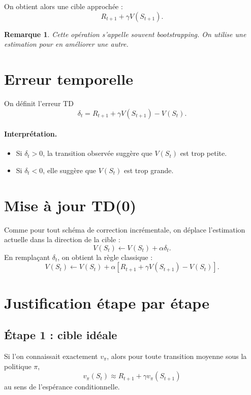 \documentclass[11pt,a4paper]{article}
\newtheorem*{remarque}{Remarque}
\begin{document}
On obtient alors une cible approchée :
\[
R_{t+1}+\gamma V(S_{t+1}).
\]

\begin{remarque}
Cette opération s'appelle souvent \emph{bootstrapping}. On utilise une estimation pour en améliorer une autre.
\end{remarque}

\section{Erreur temporelle}

On définit l'erreur TD
\[
\delta_t = R_{t+1}+\gamma V(S_{t+1})-V(S_t).
\]

\paragraph{Interprétation.}
\begin{itemize}[leftmargin=1.6em]
    \item Si $\delta_t>0$, la transition observée suggère que $V(S_t)$ est trop petite.
    \item Si $\delta_t<0$, elle suggère que $V(S_t)$ est trop grande.
\end{itemize}

\section{Mise à jour TD(0)}

Comme pour tout schéma de correction incrémentale, on déplace l'estimation actuelle dans la direction de la cible :
\[
V(S_t)\leftarrow V(S_t)+\alpha\delta_t.
\]
En remplaçant $\delta_t$, on obtient la règle classique :
\[
V(S_t)\leftarrow V(S_t)+\alpha\left[R_{t+1}+\gamma V(S_{t+1})-V(S_t)\right].
\]

\section{Justification étape par étape}

\subsection{Étape 1 : cible idéale}

Si l'on connaissait exactement $v_{\pi}$, alors pour toute transition moyenne sous la politique $\pi$,
\[
v_{\pi}(S_t)\approx R_{t+1}+\gamma v_{\pi}(S_{t+1})
\]
au sens de l'espérance conditionnelle.
\end{document}
